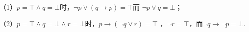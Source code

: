 \begin{solution}
    （1）$p=\top \wedge q=\bot$时，$\neg p\vee (q\rightarrow p) =\top$而
    $\neg p \vee q = \bot$；

    （2）$p=\top \wedge q=\bot \wedge r=\bot$时，$p\rightarrow(\neg q \vee r) = \top$
    ，$\neg r=\top$，而$\neg q\rightarrow \neg p = \bot$.
\end{solution}